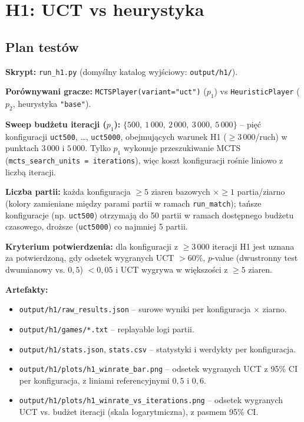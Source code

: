 \documentclass[11pt,a4paper]{article}
\begin{document}
\section{H1: UCT vs heurystyka}
\label{sec:h1}

\subsection{Plan testów}

\textbf{Skrypt:} \texttt{run\_h1.py} (domyślny katalog wyjściowy:
\texttt{output/h1/}).

\textbf{Porównywani gracze:} \texttt{MCTSPlayer(variant="uct")} ($p_1$)
vs \texttt{HeuristicPlayer} ($p_2$, heurystyka \texttt{"base"}).

\textbf{Sweep budżetu iteracji ($p_1$):}
$\{500,\ 1\,000,\ 2\,000,\ 3\,000,\ 5\,000\}$ -- pięć konfiguracji
\texttt{uct500}, \dots, \texttt{uct5000}, obejmujących warunek H1
($\geq 3\,000$/ruch) w punktach $3\,000$ i $5\,000$. Tylko $p_1$ wykonuje
przeszukiwanie MCTS (\texttt{mcts\_search\_units = iterations}), więc
koszt konfiguracji rośnie liniowo z liczbą iteracji.

\textbf{Liczba partii:} każda konfiguracja $\geq 5$ ziaren bazowych
$\times \geq 1$ partia/ziarno (kolory zamieniane między parami partii w
ramach \texttt{run\_match}); tańsze konfiguracje (np. \texttt{uct500})
otrzymają do 50 partii w ramach dostępnego budżetu czasowego, droższe
(\texttt{uct5000}) co najmniej 5 partii.

\textbf{Kryterium potwierdzenia:} dla konfiguracji z $\geq 3\,000$
iteracji H1 jest uznana za potwierdzoną, gdy odsetek wygranych UCT
$> 60\%$, $p$-value (dwustronny test dwumianowy vs. $0{,}5$) $< 0{,}05$ i
UCT wygrywa w większości z $\geq 5$ ziaren.

\textbf{Artefakty:}
\begin{itemize}
    \item \texttt{output/h1/raw\_results.json} -- surowe wyniki per
        konfiguracja $\times$ ziarno.
    \item \texttt{output/h1/games/*.txt} -- replayable logi partii.
    \item \texttt{output/h1/stats.json}, \texttt{stats.csv} -- statystyki
        i werdykty per konfiguracja.
    \item \texttt{output/h1/plots/h1\_winrate\_bar.png} -- odsetek
        wygranych UCT z 95\% CI per konfiguracja, z liniami
        referencyjnymi $0{,}5$ i $0{,}6$.
    \item \texttt{output/h1/plots/h1\_winrate\_vs\_iterations.png} --
        odsetek wygranych UCT vs. budżet iteracji (skala logarytmiczna),
        z pasmem 95\% CI.
\end{itemize}
\end{document}
